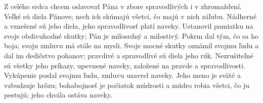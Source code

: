 Z celého srdca chcem oslavovať Pána
v zbore spravodlivých i v zhromaždení.
\versseparator
Veľké sú diela Pánove;
nech ich skúmajú všetci, čo majú v nich záľubu.
\versseparator
Nádherné a vznešené sú jeho diela,
jeho spravodlivosť platí naveky.
\versseparator
Ustanovil pamiatku na svoje obdivuhodné skutky;
Pán je milosrdný a milostivý.
Pokrm dal tým, čo sa ho boja;
\versseparator
svoju zmluvu má stále na mysli.
Svoje mocné skutky oznámil svojmu ľudu
\versseparator
a dal im dedičstvo pohanov;
pravdivé a spravodlivé sú diela jeho rúk.
\versseparator
Nezrušiteľné sú všetky jeho príkazy,
upevnené naveky,
založené na pravde a spravodlivosti.
\versseparator
Vykúpenie poslal svojmu ľudu,
zmluvu uzavrel naveky.
\versseparator
Jeho meno je sväté a vzbudzuje hrôzu;
bohabojnosť je počiatok múdrosti
\versseparator
a múdro robia všetci, čo ju pestujú;
jeho chvála ostáva naveky.